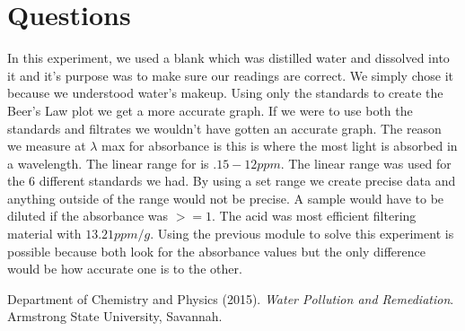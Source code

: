 \documentclass[10pt]{article}
\begin{document}
\section{Questions}
In this experiment, we used a blank which was distilled water and dissolved  into it and it's purpose was to make sure our readings are correct. We simply chose it because we understood water's makeup. Using only the standards to create the Beer's Law plot we get a more accurate graph. If we were to use both the standards and filtrates we wouldn't have gotten an accurate graph. The reason we measure at $\lambda$ max for absorbance is this is where the most light is absorbed in a wavelength. The linear range for  is $.15-12 ppm$. The linear range was used for the 6 different standards we had. By using a set range we create precise data and anything outside of the range would not be precise. A sample would have to be diluted if the absorbance was $>= 1$. The acid was most efficient filtering material with $13.21 ppm/g$. Using the previous module to solve this experiment is possible because both look for the absorbance values but the only difference would be how accurate one is to the other.

\begin{thebibliography}{1}
Department of Chemistry and Physics (2015). \textit{Water Pollution and Remediation}. Armstrong State University, Savannah.
\end{thebibliography}
\end{document}
